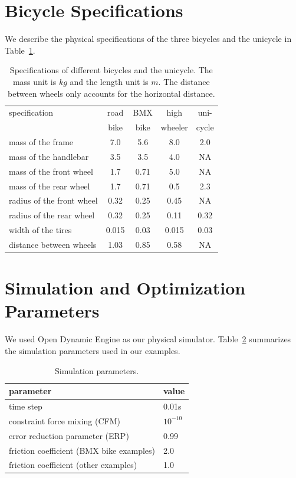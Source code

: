 \section{Bicycle Specifications}
We describe the physical specifications of the three bicycles and the unicycle in Table~\ref{table:specification}.

\begin{table}[!b]
\vspace{-0.1in}
\centering
\begin{tabular}{|l|c|c|c|c|}
\hline
specification & road & BMX  & high    & uni- \\
              & bike & bike & wheeler & cycle \\
\hline
mass of the frame & 7.0 & 5.6 & 8.0 & 2.0 \\
mass of the handlebar & 3.5 & 3.5 & 4.0 & NA \\
mass of the front wheel & 1.7 & 0.71 & 5.0 & NA \\
mass of the rear wheel &  1.7 & 0.71 & 0.5 & 2.3 \\
radius of the front wheel & 0.32 & 0.25 & 0.45 & NA  \\
radius of the rear wheel & 0.32 & 0.25 & 0.11 & 0.32  \\
width of the tires & 0.015 & 0.03 & 0.015 & 0.03 \\
distance between wheels & 1.03 & 0.85 & 0.58 & NA\\
\hline
\end{tabular}
\caption{Specifications of different bicycles and the unicycle. The mass unit is $kg$ and the length unit is $m$. The distance between wheels only accounts for the horizontal distance. }
\label{table:specification}
\end{table}

\section{Simulation and Optimization Parameters}
We used Open Dynamic Engine as our physical simulator. Table~\ref{table:simParameters} summarizes the simulation parameters used in our examples.

\begin{table}[ht]
\vspace{-0.1in}
\centering
\begin{tabular}{|l|l|}
\hline
parameter & value \\
\hline
time step & 0.01s \\
constraint force mixing (CFM) & $10^{-10}$ \\
error reduction parameter (ERP) & 0.99 \\
friction coefficient (BMX bike examples) & 2.0 \\
friction coefficient (other examples) & 1.0  \\
\hline
\end{tabular}
\caption{Simulation parameters. }
\label{table:simParameters}
\end{table}

